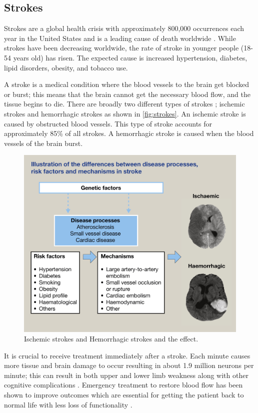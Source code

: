 \subsection{Strokes}
Strokes are a global health crisis with approximately 800,000 occurrences each year in the United States and is a leading cause of death worldwide \cite{george2017cdc} \cite{murphy2020stroke} \cite{feigin2015update}. While strokes have been decreasing worldwide, the rate of stroke in younger people (18-54 years old) has risen. The expected cause is increased hypertension, diabetes, lipid disorders, obesity, and tobacco use. 

A stroke is a medical condition where the blood vessels to the brain get blocked or burst; this means that the brain cannot get the necessary blood flow, and the tissue begins to die. There are broadly two different types of strokes \cite{perna2015rehabilitation}; ischemic strokes and hemorrhagic strokes as shown in \autoref{fig:strokes}. An ischemic stroke is caused by obstructed blood vessels. This type of stroke accounts for approximately 85\% of all strokes. A hemorrhagic stroke is caused when the blood vessels of the brain burst.  

\begin{figure}
    \centering
    \includegraphics[scale=0.85]{images/background/stroke.jpg}
    \caption[Ischemic strokes and Hemorrhagic strokes]{Ischemic strokes and Hemorrhagic strokes and the effect. \cite{murphy2020stroke}}
    \label{fig:strokes}
\end{figure}


It is crucial to receive treatment immediately after a stroke. Each minute causes more tissue and brain damage to occur \cite{saver2006time} resulting in about 1.9 million neurons per minute; this can result in both upper and lower limb weakness along with other cognitive complications \cite{pennycott2012towards}. Emergency treatment to restore blood flow has been shown to improve outcomes which are essential for getting the patient back to normal life with less loss of functionality \cite{goyal2016endovascular}.  